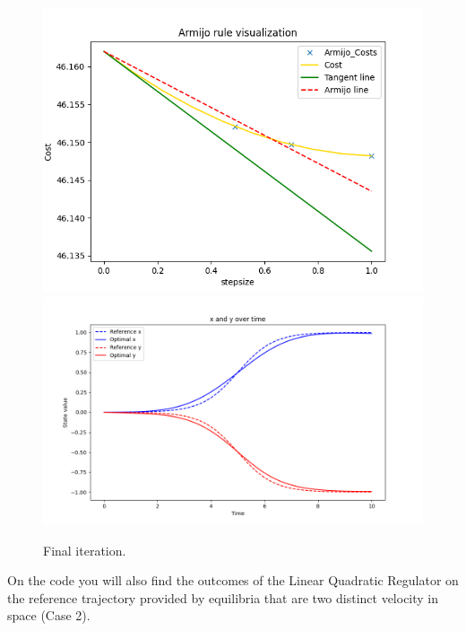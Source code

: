 \begin{figure}[H]
  \centering
  \includegraphics[width=1\textwidth]{pictures/Figure_4_1.png}\hfill\\
  \includegraphics[width=1\textwidth]{pictures/Figure_4_2.png}\hfill
  \caption{Final iteration.}
\end{figure}

On the code you will also find the outcomes of the Linear Quadratic Regulator on the reference trajectory provided by equilibria that are two distinct velocity in space (Case 2).